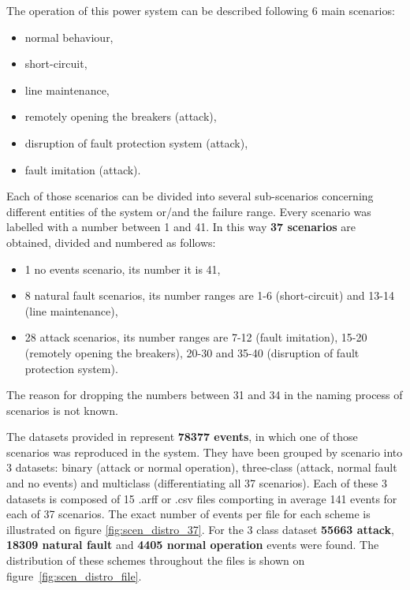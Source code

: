 The operation of this power system can be described following 6 main scenarios:
\begin{itemize}
    \item normal behaviour, 
    \item short-circuit,
    \item line maintenance,
    \item remotely opening the breakers (attack),
    \item disruption of fault protection system (attack),
    \item fault imitation (attack).
\end{itemize} 
Each of those scenarios can be divided into several sub-scenarios concerning different entities of the system or/and the failure range. Every scenario was labelled with a number between 1 and 41. In this way \textbf{37 scenarios} are obtained, divided and numbered as follows:
\begin{itemize}
    \item 1 no events scenario, its number it is 41,
    \item 8 natural fault scenarios, its number ranges are 1-6 (short-circuit) and 13-14 (line maintenance),
    \item 28 attack scenarios, its number ranges are 7-12 (fault imitation), 15-20 (remotely opening the breakers), 20-30 and 35-40 (disruption of fault protection system).
\end{itemize}
The reason for dropping the numbers between 31 and 34 in the naming process of scenarios is not known.

The datasets provided in \cite{morris_industrial_nodate} represent \textbf{78377 events}, in which one of those scenarios was reproduced in the system. They have been grouped by scenario into 3 datasets: binary (attack or normal operation), three-class (attack, normal fault and no events) and multiclass (differentiating all 37 scenarios). Each of these 3 datasets is composed of 15 .arff or .csv files comporting in average 141 events for each of 37 scenarios. The exact number of events per file for each scheme is illustrated on figure \ref{fig:scen_distro_37}. For the 3 class dataset \textbf{55663 attack}, \textbf{18309 natural fault} and \textbf{4405 normal operation} events were found. The distribution of these schemes throughout the files is shown on figure~\ref{fig:scen_distro_file}. 

